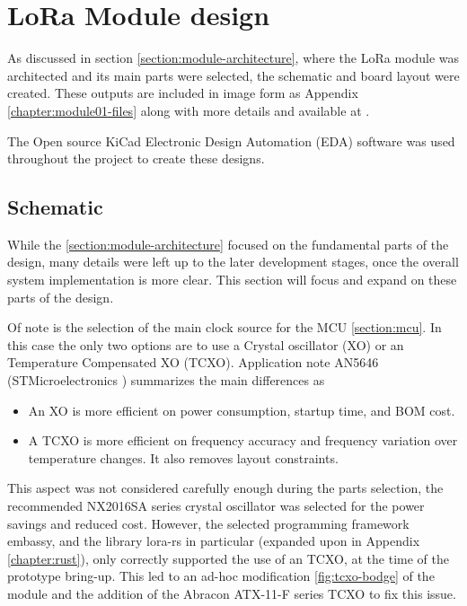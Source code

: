 
\section{LoRa Module design}
As discussed in section \ref{section:module-architecture}, where the LoRa module was architected and its main parts were selected, the schematic and board layout were created. These outputs are included in image form as Appendix \ref{chapter:module01-files} along with more details and available at .

The Open source KiCad Electronic Design Automation (EDA) software was used throughout the project to create these designs.

\subsection{Schematic}
While the \ref{section:module-architecture} focused on the fundamental parts of the design, many details were left up to the later development stages, once the overall system implementation is more clear. This section will focus and expand on these parts of the design.

Of note is the selection of the main clock source for the MCU \ref{section:mcu}. In this case the only two options are to use a Crystal oscillator (XO) or an Temperature Compensated XO (TCXO). Application note AN5646 (STMicroelectronics \cite{stmicroelectronics_how_nodate-1}) summarizes the main differences as
\begin{itemize}
    \item An XO is more efficient on power consumption, startup time, and BOM cost.
    \item A TCXO is more efficient on frequency accuracy and frequency variation over temperature changes. It also
    removes layout constraints.
\end{itemize}

This aspect was not considered carefully enough during the parts selection, the recommended NX2016SA series crystal oscillator was selected for the power savings and reduced cost. However, the selected programming framework embassy, and the library lora-rs in particular (expanded upon in Appendix \ref{chapter:rust}), only correctly supported the use of an TCXO, at the time of the prototype bring-up. This led to an ad-hoc modification \ref{fig:tcxo-bodge} of the module and the addition of the Abracon ATX-11-F series TCXO to fix this issue.

